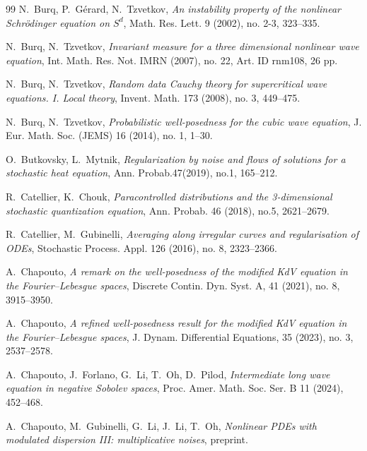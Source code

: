 \documentclass[letterpaper, 11pt,  reqno]{amsart}
\newcommand{\1}{\hspace{0.5mm}\text{I}\hspace{0.5mm}}
\numberwithin{equation}{section}
\numberwithin{theorem}{section}
\begin{document}
\begin{thebibliography}{99}
N.~Burq, P.~G\'erard, N.~Tzvetkov,
{\it  An instability property of the nonlinear Schr\"odinger equation on $S^d$},  Math. Res. Lett. 9 (2002), no. 2-3, 323--335.

N.~Burq, N.~Tzvetkov, 
{\it Invariant measure for a three dimensional nonlinear wave equation},
 Int. Math. Res. Not. IMRN (2007), no. 22, Art. ID rnm108, 26 pp.


N.~Burq, N.~Tzvetkov, 
{\it Random data Cauchy theory for supercritical wave equations. I. Local theory},
 Invent. Math. 173 (2008), no. 3, 449--475. 


N.~Burq, N.~Tzvetkov, 
{\it Probabilistic well-posedness for the cubic wave equation},
 J. Eur. Math. Soc. (JEMS) 16 (2014), no. 1, 1--30. 
 
 

O.~Butkovsky, L.~Mytnik, 
{\it Regularization by noise and flows of solutions for a stochastic heat equation},
Ann. Probab.47(2019), no.1, 165--212.


R.~Catellier, K.~Chouk,
{\it Paracontrolled distributions and the 3-dimensional stochastic quantization equation},
Ann. Probab. 46 (2018), no.5, 2621--2679.





R.~Catellier, M.~Gubinelli, 
{\it Averaging along irregular curves and regularisation of ODEs}, 
Stochastic Process. Appl. 126 (2016), no. 8, 2323--2366. 



A.~Chapouto, 
{\it A remark on the well-posedness of the modified KdV equation in the Fourier--Lebesgue spaces}, Discrete Contin. Dyn. Syst. A, 41 (2021), no. 8, 3915--3950.

A.~Chapouto, 
{\it  A refined well-posedness result for the modified KdV equation in the Fourier--Lebesgue spaces}, 
 J. Dynam. Differential Equations, 35 (2023), no. 3, 2537--2578.



A.~Chapouto, J.~Forlano, G.~Li, T.~Oh, D.~Pilod,
{\it  Intermediate long wave equation in negative Sobolev spaces},
 Proc. Amer. Math. Soc. Ser. B 11 (2024), 452--468.



A.~Chapouto, M.~Gubinelli, G.~Li, J.~Li, T.~Oh, 
{\it Nonlinear PDEs with modulated dispersion III: multiplicative noises}, 
preprint.



\end{thebibliography}
\end{document}
